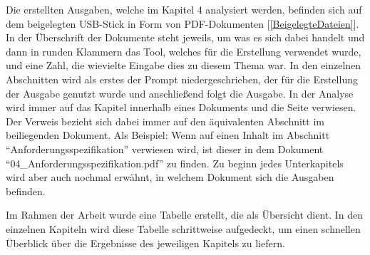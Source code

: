 Die erstellten Ausgaben, welche im Kapitel 4 analysiert werden, befinden sich auf dem beigelegten USB-Stick 
in Form von PDF-Dokumenten [\autoref{BeigelegteDateien}]. In der Überschrift der Dokumente steht jeweils, 
um was es sich dabei handelt und dann in runden Klammern das Tool, welches für die Erstellung verwendet 
wurde, und eine Zahl, die wievielte Eingabe dies zu diesem Thema war. In den einzelnen Abschnitten wird als erstes der 
Prompt niedergeschrieben, der für die Erstellung der Ausgabe genutzt wurde und anschließend folgt die Ausgabe. In der Analyse wird immer auf 
das Kapitel innerhalb eines Dokuments und die Seite verwiesen. Der Verweis bezieht sich dabei immer auf 
den äquivalenten Abschnitt im beiliegenden Dokument. Als Beispiel: Wenn auf einen Inhalt im Abschnitt ``Anforderungsspezifikation'' verwiesen wird, 
ist dieser in dem Dokument ``04\_Anforderungsspezifikation.pdf'' zu finden. Zu beginn jedes Unterkapitels wird aber auch nochmal 
erwähnt, in welchem Dokument sich die Ausgaben befinden.

Im Rahmen der Arbeit wurde eine Tabelle erstellt, die als Übersicht dient. In den einzelnen Kapiteln wird diese Tabelle 
schrittweise aufgedeckt, um einen schnellen Überblick über die Ergebnisse des jeweiligen Kapitels zu liefern.